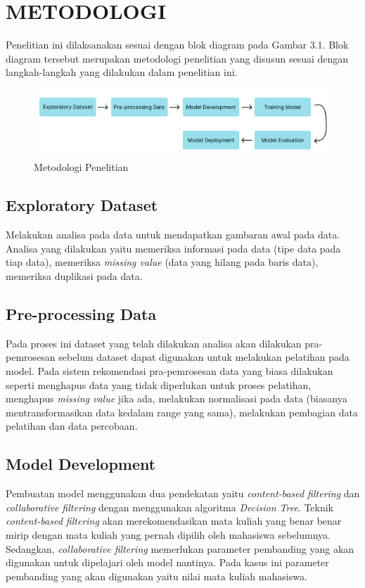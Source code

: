 \section{METODOLOGI}

Penelitian ini dilaksanakan sesuai dengan blok diagram pada Gambar 3.1. Blok diagram tersebut
merupakan metodologi penelitian yang disusun sesuai dengan langkah-langkah yang dilakukan dalam penelitian ini.

\begin{figure} [ht] \centering
  \includegraphics[width=160mm]{gambar/diagram-blok.png}
  \caption{Metodologi Penelitian}
\end{figure}


\subsection{Exploratory Dataset}
Melakukan analisa pada data untuk mendapatkan gambaran awal pada data. Analisa yang dilakukan yaitu
memeriksa informasi pada data (tipe data pada tiap data), memeriksa \emph{missing value} {(data yang hilang pada baris data)},
memeriksa duplikasi pada data.


\subsection{Pre-processing Data}
Pada proses ini dataset yang telah dilakukan analisa akan dilakukan pra-pemrosesan sebelum dataset dapat digunakan
untuk melakukan pelatihan pada model. Pada sistem rekomendasi pra-pemrosesan data yang biasa dilakukan seperti menghapus data
yang tidak diperlukan untuk proses pelatihan, menghapus \emph{missing value} jika ada, melakukan normalisasi pada data (biasanya mentransformasikan data kedalam range yang sama),
melakukan pembagian data pelatihan dan data percobaan.

\subsection{Model Development}
Pembuatan model menggunakan dua pendekatan yaitu \emph{content-based filtering} dan \emph{collaborative filtering} dengan menggunakan algoritma \emph{Decision Tree}. Teknik
\emph{content-based filtering} akan merekomendasikan mata kuliah yang benar benar mirip dengan mata kuliah yang pernah dipilih oleh mahasiswa sebelumnya. Sedangkan, \emph{collaborative filtering}
memerlukan parameter pembanding yang akan digunakan untuk dipelajari oleh model nantinya. Pada kasus ini parameter pembanding yang akan digunakan yaitu nilai mata kuliah mahasiswa.

